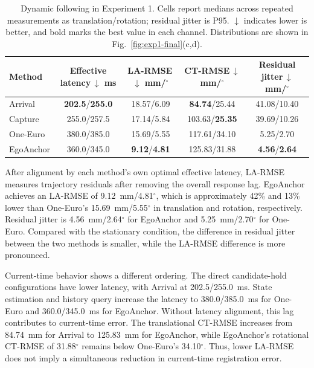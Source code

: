 \documentclass[review]{vgtc}
\begin{document}
\begin{table}[t]
\centering
\caption{Dynamic following in Experiment 1. Cells report medians across repeated measurements as translation/rotation; residual jitter is P95. $\downarrow$ indicates lower is better, and bold marks the best value in each channel. Distributions are shown in Fig.~\ref{fig:exp1-final}(c,d).}
\label{tab:exp1-dynamic}
\setlength{\tabcolsep}{2pt}
\begin{tabular}{@{}lcccc@{}}
\toprule
Method & \shortstack{Effective\\latency\,$\downarrow$\\ms} & \shortstack{LA-RMSE\,$\downarrow$\\mm/$^\circ$} & \shortstack{CT-RMSE\,$\downarrow$\\mm/$^\circ$} & \shortstack{Residual\\jitter\,$\downarrow$\\mm/$^\circ$} \\
\midrule
Arrival & \textbf{202.5}/\textbf{255.0} & 18.57/6.09 & \textbf{84.74}/25.44 & 41.08/10.40 \\
Capture & 255.0/257.5 & 17.14/5.84 & 103.63/\textbf{25.35} & 39.69/10.26 \\
One-Euro & 380.0/385.0 & 15.69/5.55 & 117.61/34.10 & 5.25/2.70 \\
EgoAnchor & 360.0/345.0 & \textbf{9.12}/\textbf{4.81} & 125.83/31.88 & \textbf{4.56}/\textbf{2.64} \\
\bottomrule
\end{tabular}
\end{table}

After alignment by each method's own optimal effective latency, LA-RMSE measures trajectory residuals after removing the overall response lag. EgoAnchor achieves an LA-RMSE of 9.12~mm/4.81$^\circ$, which is approximately 42\% and 13\% lower than One-Euro's 15.69~mm/5.55$^\circ$ in translation and rotation, respectively. Residual jitter is 4.56~mm/2.64$^\circ$ for EgoAnchor and 5.25~mm/2.70$^\circ$ for One-Euro. Compared with the stationary condition, the difference in residual jitter between the two methods is smaller, while the LA-RMSE difference is more pronounced.

Current-time behavior shows a different ordering. The direct candidate-hold configurations have lower latency, with Arrival at 202.5/255.0~ms. State estimation and history query increase the latency to 380.0/385.0~ms for One-Euro and 360.0/345.0~ms for EgoAnchor. Without latency alignment, this lag contributes to current-time error. The translational CT-RMSE increases from 84.74~mm for Arrival to 125.83~mm for EgoAnchor, while EgoAnchor's rotational CT-RMSE of 31.88$^\circ$ remains below One-Euro's 34.10$^\circ$. Thus, lower LA-RMSE does not imply a simultaneous reduction in current-time registration error.
\end{document}
